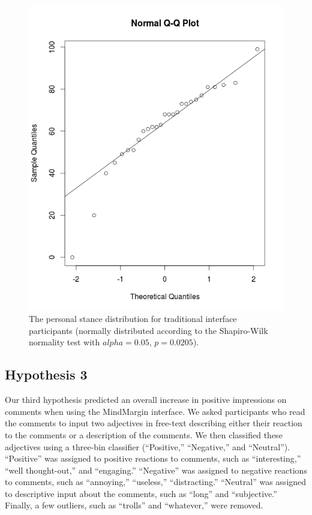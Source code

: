 \begin{figure}[h]
\centering
\includegraphics[scale=0.25]{regular_normal.png}
\caption{The personal stance distribution for traditional interface participants (normally distributed according to the Shapiro-Wilk normality test with $alpha=0.05$, $p=0.0205$).}
\label{fig:reg_normal}
\end{figure}

\subsection{Hypothesis 3}
Our third hypothesis predicted an overall increase in positive impressions on comments when using the MindMargin interface. We asked participants who read the comments to input two adjectives in free-text describing either their reaction to the comments or a description of the comments. We then classified these adjectives using a three-bin classifier (“Positive,” “Negative,” and “Neutral”). “Positive” was assigned to positive reactions to comments, such as “interesting,” “well thought-out,” and “engaging.” “Negative” was assigned to negative reactions to comments, such as “annoying,” “useless,” “distracting.” “Neutral” was assigned to descriptive input about the comments, such as “long” and “subjective.” Finally, a few outliers, such as “trolls” and “whatever,” were removed. 

